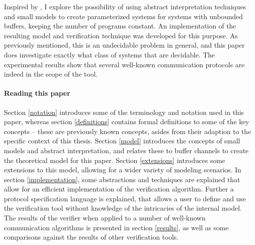 Inspired by \cite{parosh}, I explore the possibility of using abstract interpretation techniques and small models to create parameterized systems for systems with unbounded buffers, keeping the number of programs constant. An implementation of the resulting model and verification technique was developed for this purpose. As previously mentioned, this is an undecidable problem in general, and this paper does  investigate exactly what class of systems that are decidable. The experimental results show that several well-known communication protocols are indeed in the scope of the tool.

\paragraph{Reading this paper} Section \ref{notation} introduces some of the terminology and notation used in this paper, whereas section \ref{definitions} contains formal definitions to some of the key concepts -- these are previously known concepts, asides from their adaption to the specific context of this thesis. Section \ref{model} introduces the concepts of small models and abstract interpretation, and relates these to buffer channels to create the theoretical model for this paper. Section \ref{extensions} introduces some extensions to this model, allowing for a wider variety of modeling scenarios. In section \ref{implementation}, some abstractions and techniques are explained that allow for an efficient implementation of the verification algorithm. Further a protocol specification language is explained, that allows a user to define and use the verification tool without knowledge of the intricacies of the internal model. The results of the verifier when applied to a number of well-known communication algorithms is presented in section \ref{results}, as well as some comparisons against the results of other verification tools.

 	

